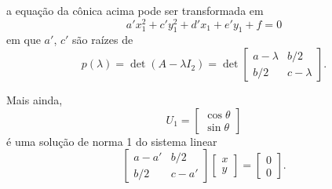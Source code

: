 \documentclass{beamer}
\begin{document}
\begin{frame}
    \begin{teorema}
        a equação da cônica acima pode ser transformada em\pause
        \[
            a'x_1^2 + c'y_1^2 + d'x_1 + e'y_1 + f = 0
        \]\pause
        em que $a'$, $c'$ são raízes de\pause
        \[
            p(\lambda) = \det(A - \lambda I_2) = \det \begin{bmatrix}
                a - \lambda & b/2         \\
                b/2         & c - \lambda
            \end{bmatrix}.
        \]\pause

        Mais ainda,
        \[
            U_1 = \begin{bmatrix}
                \cos\theta \\ \sin\theta
            \end{bmatrix}
        \]\pause
        é uma solução de norma 1 do sistema linear\pause
        \[
            \begin{bmatrix}
                a - a' & b/2    \\
                b/2    & c - a'
            \end{bmatrix} \begin{bmatrix}
                x \\y
            \end{bmatrix} = \begin{bmatrix}
                0 \\0
            \end{bmatrix}.
        \]
    \end{teorema}
\end{frame}
\end{document}
